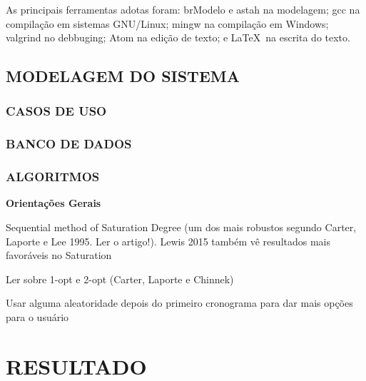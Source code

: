 \documentclass[12pt,a4paper]{article}
\begin{document}
			\par As principais ferramentas adotas foram: brModelo e astah na modelagem; gcc na compilação em sistemas GNU/Linux; mingw na compilação em Windows; valgrind no debbuging; Atom na edição de texto; e \LaTeX \, na escrita do texto.

		\subsection{MODELAGEM DO SISTEMA}

			\lipsum[1]


			\subsubsection{CASOS DE USO}

				\lipsum[1]

			\subsubsection{BANCO DE DADOS}

				\lipsum[1]

			\subsubsection{ALGORITMOS}

				\textbf{Orientações Gerais}

				\par Sequential method of Saturation Degree (um dos mais robustos segundo Carter, Laporte e Lee 1995. Ler o artigo!).
				Lewis 2015 também vê resultados mais favoráveis no Saturation

				\par Ler sobre 1-opt e 2-opt (Carter, Laporte e Chinnek)

				\par Usar alguma aleatoridade depois do primeiro cronograma para dar mais opções para o usuário



	\section{RESULTADO}
\end{document}
